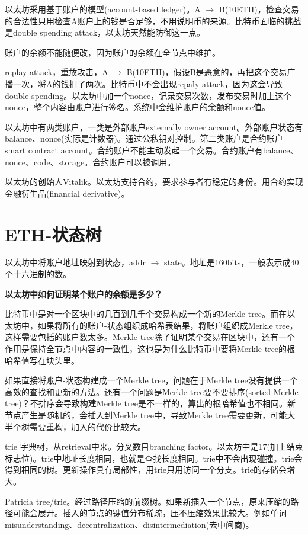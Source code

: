 \documentclass[10pt]{ctexart}
\begin{document}
以太坊采用基于账户的模型(account-based ledger)。A $\rightarrow$ B(10ETH)，检查交易的合法性只用检查A账户上的钱是否足够，不用说明币的来源。比特币面临的挑战是double spending attack，以太坊天然能防御这一点。

账户的余额不能随便改，因为账户的余额在全节点中维护。

replay attack，重放攻击，A $\rightarrow$ B(10ETH)，假设B是恶意的，再把这个交易广播一次，将A的钱扣了两次。比特币中不会出现repaly attack，因为这会导致double spending。以太坊中加一个nonce，记录交易次数，发布交易时加上这个nonce，整个内容由账户进行签名。系统中会维护账户的余额和nonce值。

以太坊中有两类账户，一类是外部账户externally owner account。外部账户状态有balance、nonce(实际是计数器)。通过公私钥对控制。第二类账户是合约账户smart contract account。合约账户不能主动发起一个交易。合约账户有balance、nonce、code、storage。合约账户可以被调用。

以太坊的创始人Vitalik。以太坊支持合约，要求参与者有稳定的身份。用合约实现金融衍生品(financial derivative)。

\section{ETH-状态树}
以太坊中将账户地址映射到状态，addr $\rightarrow$ state。地址是160bits，一般表示成40个十六进制的数。

\textbf{以太坊中如何证明某个账户的余额是多少？}

比特币中是对一个区块中的几百到几千个交易构成一个新的Merkle tree。而在以太坊中，如果将所有的账户-状态组织成哈希表结果，将账户组织成Merkle tree，这样需要包括的账户数太多。Merkle tree除了证明某个交易在区块中，还有一个作用是保持全节点中内容的一致性，这也是为什么比特币中要将Merkle tree的根哈希值写在块头里。

如果直接将账户-状态构建成一个Merkle tree，问题在于Merkle tree没有提供一个高效的查找和更新的方法。还有一个问题是Merkle tree要不要排序(sorted Merkle tree)？不排序会导致构建Merkle tree是不一样的，算出的根哈希值也不相同。新节点产生是随机的，会插入到Merkle tree中，导致Merkle tree需要更新，可能大半个树需要重构，加入的代价比较大。

trie 字典树，从retrieval中来。分叉数目branching factor。以太坊中是17(加上结束标志位)。trie中地址长度相同，也就是查找长度相同。trie中不会出现碰撞。trie会得到相同的树。更新操作具有局部性，用trie只用访问一个分支。trie的存储会增大。

Patricia tree/trie。经过路径压缩的前缀树。如果新插入一个节点，原来压缩的路径可能会展开。插入的节点的键值分布稀疏，压不压缩效果比较大。例如单词misunderstanding、decentralization、disintermediation(去中间商)。
\end{document}
